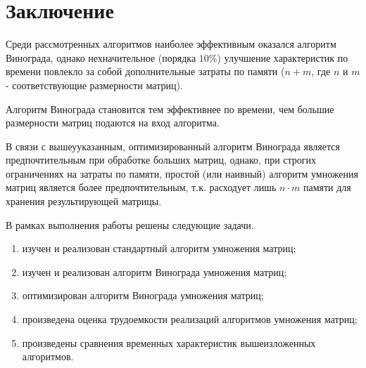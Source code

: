 \chapter*{Заключение}

Среди рассмотренных алгоритмов наиболее эффективным оказался алгоритм Винограда, однако нехначительное (порядка $ 10\% $) улучшение характеристик по времени повлекло за собой дополнительные затраты по памяти ($n + m$, где $n$ и $m$ - соответствующие размерности матриц).

Алгоритм Винограда становится тем эффективнее по времени, чем большие размерности матриц подаются на вход алгоритма.

В связи с вышеууказанным, оптимизированный алгоритм Винограда является предпочтительным при обработке больших матриц, однако, при строгих ограничениях на затраты по памяти, простой (или наивный) алгоритм умножения матриц является более предпочтительным, т.к. расходует лишь $n \cdot m$ памяти для хранения результирующей матрицы.


В рамках выполнения работы решены следующие задачи.
\begin{enumerate}
	\item изучен и реализован стандартный алгоритм умножения матриц;
	\item изучен и реализован алгоритм Винограда умножения матриц;
	\item оптимизирован алгоритм Винограда умножения матриц;
	\item произведена оценка трудоемкости реализаций алгоритмов умножения матриц;
	\item произведены сравнения временных характеристик вышеизложенных алгоритмов.
\end{enumerate}
